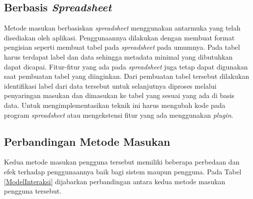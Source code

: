 	\subsection{Berbasis \textit{Spreadsheet}}
	Metode masukan berbasiskan \textit{spreadsheet} menggunakan antarmuka yang telah disediakan oleh aplikasi. Penggunaannya dilakukan dengan membuat format pengisian seperti membuat tabel pada \textit{spreadsheet} pada umumnya. Pada tabel harus terdapat label dan data sehingga metadata minimal yang dibutuhkan dapat dicapai. Fitur-fitur yang ada pada \textit{spreadsheet} juga tetap dapat digunakan saat pembuatan tabel yang diinginkan. Dari pembuatan tabel tersebut dilakukan identifikasi label dari data tersebut untuk selanjutnya diproses melalui penyaringan masukan dan dimasukan ke tabel yang sesuai yang ada di basis data. Untuk mengimplementasikan teknik ini harus mengubah kode pada program \textit{spreadsheet} atau mengekstensi fitur yang ada menggunakan \textit{plugin}. 

	\subsection{Perbandingan Metode Masukan}
	Kedua metode masukan pengguna tersebut memiliki beberapa perbedaan dan efek terhadap penggunaannya baik bagi sistem maupun pengguna. Pada Tabel \ref{ModelInteraksi} dijabarkan perbandingan antara kedua metode masukan pengguna tersebut.

